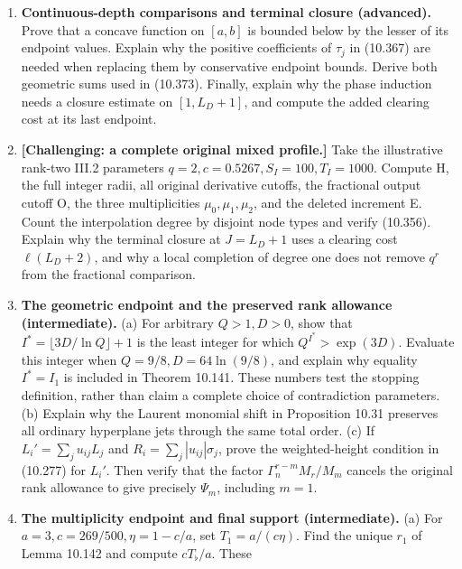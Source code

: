 \documentclass[
  11pt,
  a4paper,
]{article}
\begin{document}
\begin{enumerate}
  multiplicities, compute the four deleted-node residue counts modulo
  four, and derive the three cardinal-factor bounds from (10.354).
  Verify the total degree by both the annular and telescoping formulas.
  Explain why replacing the discrepancy two by one changes the proof.
\item
  \textbf{Continuous-depth comparisons and terminal closure (advanced).}
  Prove that a concave function on \([a,b]\) is bounded below by the
  lesser of its endpoint values. Explain why the positive coefficients
  of \(\tau_j\) in (10.367) are needed when replacing them by
  conservative endpoint bounds. Derive both geometric sums used in
  (10.373). Finally, explain why the phase induction needs a closure
  estimate on \([1,L_D+1]\), and compute the added clearing cost at its
  last endpoint.
\item
  \textbf{{[}Challenging: a complete original mixed profile.{]}} Take
  the illustrative rank-two III.2 parameters
  \(q=2,c=0.5267,S_I=100,T_I=1000\). Compute H, the full integer radii,
  all original derivative cutoffs, the fractional output cutoff O, the
  three multiplicities \(\mu_0,\mu_1,\mu_2\), and the deleted increment
  E. Count the interpolation degree by disjoint node types and verify
  (10.356). Explain why the terminal closure at \(J=L_D+1\) uses a
  clearing cost \(\ell(L_D+2)\), and why a local completion of degree
  one does not remove \(q^r\) from the fractional comparison.
\item
  \textbf{The geometric endpoint and the preserved rank allowance
  (intermediate).} (a) For arbitrary \(Q>1,D>0\), show that
  \(I^*=\lfloor3D/\ln Q\rfloor+1\) is the least integer for which
  \(Q^{I^*}>\exp(3D)\). Evaluate this integer when
  \(Q=9/8,D=64\ln(9/8)\), and explain why equality \(I^*=I_1\) is
  included in Theorem 10.141. These numbers test the stopping
  definition, rather than claim a complete choice of contradiction
  parameters. (b) Explain why the Laurent monomial shift in Proposition
  10.31 preserves all ordinary hyperplane jets through the same total
  order. (c) If \(L_i'=\sum_ju_{ij}L_j\) and
  \(R_i=\sum_j|u_{ij}|\sigma_j\), prove the weighted-height condition in
  (10.277) for \(L_i'\). Then verify that the factor
  \(\Gamma_n^{r-m}M_r/M_m\) cancels the original rank allowance to give
  precisely \(\Psi_m\), including \(m=1\).
\item
  \textbf{The multiplicity endpoint and final support (intermediate).}
  (a) For \(a=3,c=269/500,\eta=1-c/a\), set \(T_1=a/(c\eta)\). Find the
  unique \(r_1\) of Lemma 10.142 and compute \(cT_\flat/a\). These

\end{enumerate}
\end{document}

